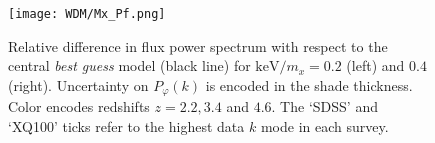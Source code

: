 


\begin{figure}
\begin{center}
\texttt{[image: WDM/Mx\_Pf.png]}
\caption{Relative difference in flux power spectrum with respect to the central \textit{best guess} model (black line) for $\mathrm{keV} / m_x = 0.2$ (left) and $0.4$ (right). Uncertainty on $P_\varphi (k)$ is encoded in the shade thickness. Color encodes redshifts $z=2.2, 3.4$ and $4.6$. The `SDSS' and `XQ100' ticks refer to the highest data $k$ mode in each survey.}
\label{fig:Mx_flux}
\end{center}
\end{figure}


